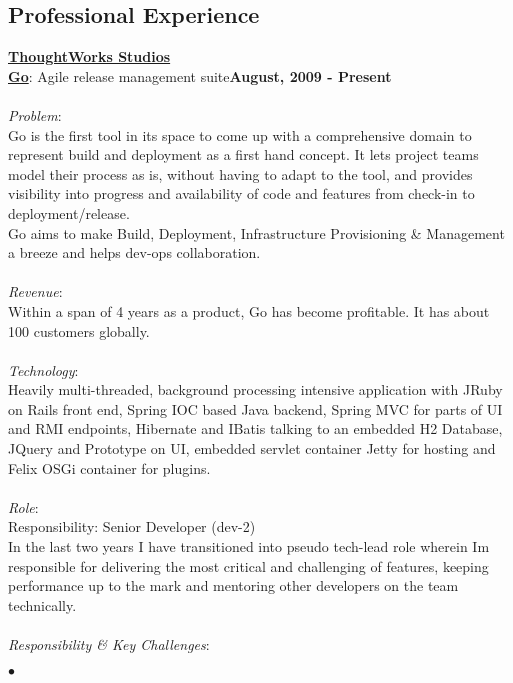 \documentclass[margin,line]{res}
\newenvironment{list2}{
  \begin{list}{$\bullet$}{%
      \setlength{\itemsep}{0in}
      \setlength{\parsep}{0in} \setlength{\parskip}{0in}
      \setlength{\topsep}{0in} \setlength{\partopsep}{0in} 
      \setlength{\leftmargin}{0.2in}}}{\end{list}}
\begin{document}
\begin{resume}
\section{\sc Professional Experience}
{\underline {\bf ThoughtWorks Studios}}\\
\vspace{-.1cm}
\href{http://www.thoughtworks-studios.com/go-agile-release-management}{\bf Go}: Agile release management suite\hfill {\bf August, 2009 - Present}\\
\vspace{-.2cm}\\
{\em Problem}:\\
Go is the first tool in its space to come up with a comprehensive domain to represent build and deployment as a first hand concept. It lets project teams model their process as is, without having to adapt to the tool, and provides visibility into progress and availability of code and features from check-in to deployment/release.\\
Go aims to make Build, Deployment, Infrastructure Provisioning \& Management a breeze and helps dev-ops collaboration.\\
\\
{\em Revenue}:\\
Within a span of 4 years as a product, Go has become profitable. It has about 100 customers globally.\\
\\
{\em Technology}:\\
Heavily multi-threaded, background processing intensive application with JRuby on Rails front end, Spring IOC based Java backend, Spring MVC for parts of UI and RMI endpoints, Hibernate and IBatis talking to an embedded H2 Database, JQuery and Prototype on UI, embedded servlet container Jetty for hosting and Felix OSGi container for plugins.\\
\\
{\em Role}: \\
Responsibility: Senior Developer (dev-2)\\
In the last two years I have transitioned into pseudo tech-lead role wherein Im responsible for delivering the most critical and challenging of features, keeping performance up to the mark and mentoring other developers on the team technically.\\
\\
{\em Responsibility \& Key Challenges}:
\vspace*{.05in}  
\begin{list2}

\end{list2}
\end{resume}
\end{document}
